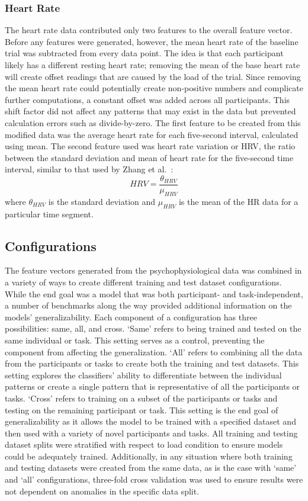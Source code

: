\documentclass[11pt]{article}
\begin{document}
		\subsubsection{Heart Rate}
		The heart rate data contributed only two features to the overall feature vector. Before any features were generated, however, the mean heart rate of the baseline trial was subtracted from every data point. The idea is that each participant likely has a different resting heart rate; removing the mean of the base heart rate will create offset readings that are caused by the load of the trial. Since removing the mean heart rate could potentially create non-positive numbers and complicate further computations, a constant offset was added across all participants. This shift factor did not affect any patterns that may exist in the data but prevented calculation errors such as divide-by-zero. The first feature to be created from this modified data was the average heart rate for each five-second interval, calculated using mean. The second feature used was heart rate variation or HRV, the ratio between the standard deviation and mean of heart rate for the five-second time interval, similar to that used by Zhang et al.~\cite{Zhang}: \[HRV = \frac{\theta_{HRV}}{\mu_{HRV}}\] where \( \theta_{HRV} \) is the standard deviation and \( \mu_{HRV}\) is the mean of the HR data for a particular time segment.
				
		
	\subsection{Configurations}
	The feature vectors generated from the psychophysiological data was combined in a variety of ways to create different training and test dataset configurations. While the end goal was a model that was both participant- and task-independent, a number of benchmarks along the way provided additional information on the models' generalizability. Each component of a configuration has three possibilities: same, all, and cross. `Same' refers to being trained and tested on the same individual or task. This setting serves as a control, preventing the component from affecting the generalization. `All' refers to combining all the data from the participants or tasks to create both the training and test datasets. This setting explores the classifiers' ability to differentiate between the individual patterns or create a single pattern that is representative of all the participants or tasks. `Cross' refers to training on a subset of the participants or tasks and testing on the remaining participant or task. This setting is the end goal of generalizability as it allows the model to be trained with a specified dataset and then used with a variety of novel participants and tasks. All training and testing dataset splits were stratified with respect to load condition to ensure models could be adequately trained. Additionally, in any situation where both training and testing datasets were created from the same data, as is the case with `same' and `all' configurations, three-fold cross validation was used to ensure results were not dependent on anomalies in the specific data split.
	
\end{document}
